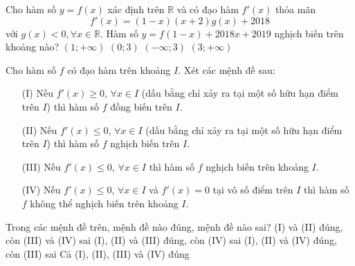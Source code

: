 \begin{ex}%
	Cho hàm số $y=f(x)$ xác định trên $\mathbb{R}$ và có đạo hàm $f'(x)$ thỏa mãn $$f'(x)=\left({1-x}\right)\left({x+2}\right)g(x)+2018$$ với $g(x)<0,\forall x\in \mathbb{R}$. Hàm số $y=f(1-x)+2018x+2019$ nghịch biến trên khoảng nào? 
	\choice
	{$\left({1;+\infty}\right)$}
	{$\left({0;3}\right)$}
	{$\left({-\infty;3}\right)$}
	{\True $\left({3;+\infty}\right)$}
	\loigiai{Ta có:
		{\allowdisplaybreaks
		\begin{align*} y'&=-f'\left({1-x}\right)+2018=-\left[{1-\left({1-x}\right)}\right]\left[{\left({1-x}\right)+2}\right]g\left({1-x}\right)-2018+2018\\
		&=-x\left({3-x}\right)g\left({1-x}\right).
		\end{align*}}Suy ra $y'<0\Leftrightarrow x\left({3-x}\right)<0\Leftrightarrow \left[\begin{aligned}& x<0 \\
		& x>3 
		\end{aligned}\right.$ (do $g(1-x)<0, \forall x\in\mathbb{R}$).\\
		Vậy hàm số nghịch biến trên khoảng $(3;+\infty)$.}
\end{ex}
\begin{ex}%
Cho hàm số $f$ có đạo hàm trên khoảng $I$. Xét các mệnh đề sau:
\begin{itemize}
\item [(I)] Nếu $f'(x) \ge 0$, $\forall x \in I$  (dấu bằng chỉ xảy ra tại một số hữu hạn điểm trên $I$) thì hàm số $f$ đồng biến trên $I$.
\item [(II)] Nếu $f'(x) \le 0$, $\forall x \in I$ (dấu bằng chỉ xảy ra tại một số hữu hạn điểm trên $I$) thì hàm số $f$ nghịch biến trên $I$.
\item [(III)] Nếu $f'(x) \le 0$, $\forall x \in I$ thì hàm số $f$ nghịch biến trên khoảng $I$.
\item [(IV)] Nếu  $f'(x) \le 0$, $\forall x \in I$ và $f'(x) = 0$  tại vô số điểm trên $I$  thì hàm số $f$  không thể nghịch biến trên khoảng $I$.
\end{itemize}
Trong các mệnh đề trên, mệnh đề nào đúng, mệnh đề nào sai?
\choice
{\True  (I) và (II)  đúng, còn (III)  và (IV)  sai}
{(I), (II)   và (III)  đúng, còn (IV)  sai}
{(I), (II)   và  (IV) đúng, còn  (III) sai}
{Cả  (I), (II), (III)  và  (IV) đúng}
\end{ex}
